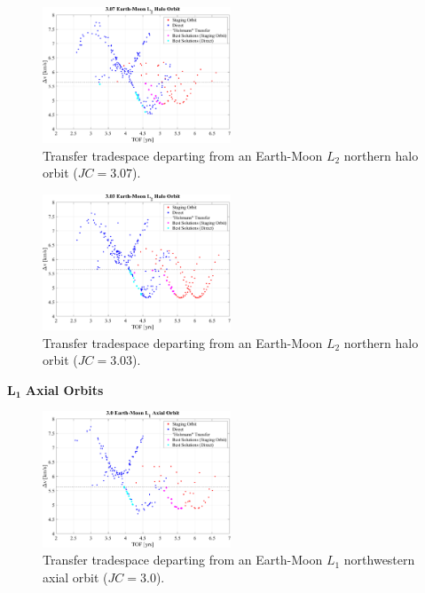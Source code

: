 \begin{figure}[ht]
    \centering
    \includegraphics[width=0.5\textwidth]{figures/TradeSpace_L2Halo_3_07.pdf}
    \caption{Transfer tradespace departing from an Earth-Moon $L_{2}$ northern halo orbit ($JC=3.07$).}
\end{figure}

\begin{figure}[ht]
    \centering
    \includegraphics[width=0.5\textwidth]{figures/TradeSpace_L2Halo_3_03.pdf}
    \caption{Transfer tradespace departing from an Earth-Moon $L_{2}$ northern halo orbit ($JC=3.03$).}
\end{figure}
\clearpage

$\pmb{L_{1}}$ \textbf{Axial Orbits}
\begin{figure}[ht]
    \centering
    \includegraphics[width=0.5\textwidth]{figures/TradeSpace_L1Axial_3_00.pdf}
    \caption{Transfer tradespace departing from an Earth-Moon $L_{1}$ northwestern axial orbit ($JC=3.0$).}
\end{figure}
\clearpage
